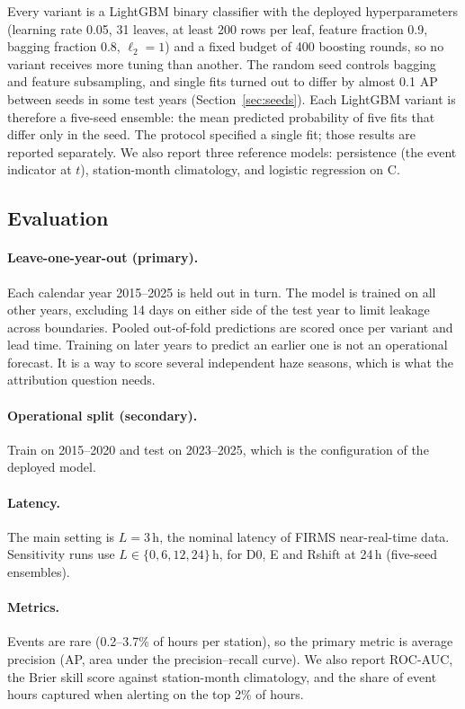 Every variant is a LightGBM binary classifier \citep{lightgbm} with the deployed hyperparameters
(learning rate 0.05, 31 leaves, at least 200 rows per leaf, feature fraction 0.9, bagging fraction
0.8, $\ell_2=1$) and a fixed budget of 400 boosting rounds, so no variant receives more tuning than
another. The random seed controls bagging and feature subsampling, and single fits turned out to
differ by almost 0.1 AP between seeds in some test years (Section~\ref{sec:seeds}). Each LightGBM
variant is therefore a five-seed ensemble: the mean predicted probability of five fits that
differ only in the seed. The protocol specified a single fit; those results are reported
separately. We also report three reference models: persistence (the event indicator at $t$),
station-month climatology, and logistic regression on C.

\subsection{Evaluation}

\paragraph{Leave-one-year-out (primary).}
Each calendar year 2015--2025 is held out in turn. The model is trained on all other years,
excluding 14 days on either side of the test year to limit leakage across boundaries. Pooled
out-of-fold predictions are scored once per variant and lead time. Training on later years to
predict an earlier one is not an operational forecast. It is a way to score several independent
haze seasons, which is what the attribution question needs.

\paragraph{Operational split (secondary).}
Train on 2015--2020 and test on 2023--2025, which is the configuration of the deployed model.

\paragraph{Latency.}
The main setting is $L=3$\,h, the nominal latency of FIRMS near-real-time data. Sensitivity runs
use $L\in\{0,6,12,24\}$\,h, for D0, E and Rshift at 24\,h (five-seed ensembles).

\paragraph{Metrics.}
Events are rare (0.2--3.7\% of hours per station), so the primary metric is average precision
(AP, area under the precision--recall curve). We also report ROC-AUC, the Brier skill score
against station-month climatology, and the share of event hours captured when alerting on the top
2\% of hours.

